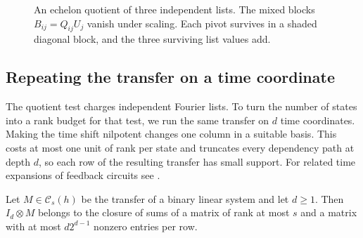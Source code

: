 \begin{figure}[htb]
\centering
{}
\caption{An echelon quotient of three independent lists. The mixed
blocks $B_{ij}=Q_{ij}U_j$ vanish under scaling. Each pivot survives
in a shaded diagonal block, and the three surviving list values add.}
\label{bch:quotient-figure}
\end{figure}

\subsection{Repeating the transfer on a time coordinate}

The quotient test charges independent Fourier lists. To turn the number
of states into a rank budget for that test, we run the same transfer on
$d$ time coordinates. Making the time shift nilpotent changes
one column in a suitable basis. This costs at most one unit of rank
per state and truncates every dependency path at depth $d$, so each
row of the resulting transfer has small support.
For related time expansions of feedback circuits see
\cite[Sections~5--6]{FiniteFourier}.

\begin{lemma}\label{bch:time-expansion}
Let $M\in\mathcal C_s(h)$ be the transfer of a binary linear system
and let $d\ge1$. Then $I_d\otimes M$ belongs to the closure of sums of
a matrix of rank at most $s$ and a matrix with at most $d2^{d-1}$
nonzero entries per row.
\end{lemma}

